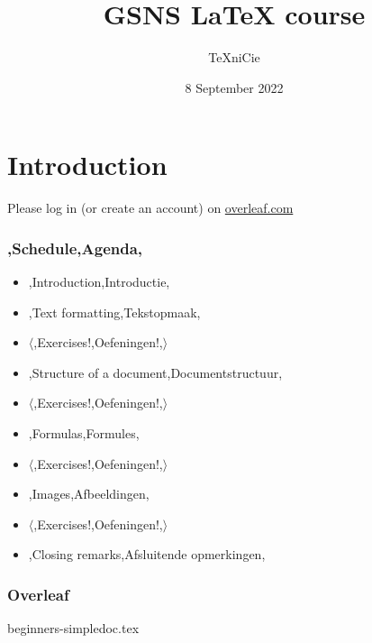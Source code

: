 \documentclass{../../cursuspresentatie}
\title{GSNS \LaTeX{} course}
\author{\TeX niCie}
\date{8 September 2022}
\def\importslide#1#2{%
	{#2}
}
\begin{document}
\section{Introduction}

\begin{frame}
	\titlepage
	\centering

	Please log in (or create an account) on \url{overleaf.com}
\end{frame}

\begin{frame}
	\frametitle{\lang,Schedule,Agenda,}
	
	\begin{itemize}
		\item \lang,Introduction,Introductie,
		\item \lang,Text formatting,Tekstopmaak,
		\item  $ \langle $\lang,Exercises!,Oefeningen!,$ \rangle $
		\item \lang,Structure of a document,Documentstructuur,
		\item $ \langle $\lang,Exercises!,Oefeningen!,$ \rangle $
		\item \lang,Formulas,Formules,
		\item $ \mathbf\langle $\lang,Exercises!,Oefeningen!,$ \rangle $
		\item  \lang,Images,Afbeeldingen,
		\item $ \mathbf\langle $\lang,Exercises!,Oefeningen!,$ \rangle $
		\item \lang,Closing remarks,Afsluitende opmerkingen,
	\end{itemize}
\end{frame}

\begin{frame}
	\frametitle{Overleaf}

\end{frame}


\importslide{beginners}{beginners-simpledoc.tex}


% 

% 

% 

% 

% 

% 

%
	
\end{document}
